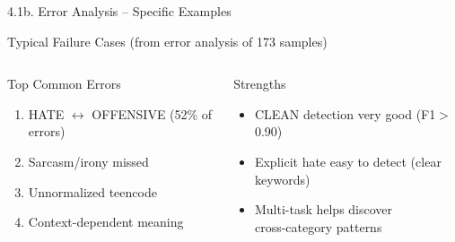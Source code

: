 \documentclass[11pt, aspectratio=169]{beamer}
\begin{document}
\begin{frame}[fragile, shrink=25]{4.1b. Error Analysis -- Specific Examples}

\begin{block}{Typical Failure Cases (from error analysis of 173 samples)}
  \centering
\end{block}

\vspace{0.2cm}
\begin{columns}[T]
  \begin{block}{Top Common Errors}
    \begin{enumerate}
      \item HATE $\leftrightarrow$ OFFENSIVE (52\% of errors)
      \item Sarcasm/irony missed
      \item Unnormalized teencode
      \item Context-dependent meaning
    \end{enumerate}
  \end{block}

  \begin{block}{Strengths}
    \begin{itemize}
      \item CLEAN detection very good (F1$>$0.90)
      \item Explicit hate easy to detect (clear keywords)
      \item Multi-task helps discover\\cross-category patterns
    \end{itemize}
  \end{block}
\end{columns}
\end{frame}
\end{document}
